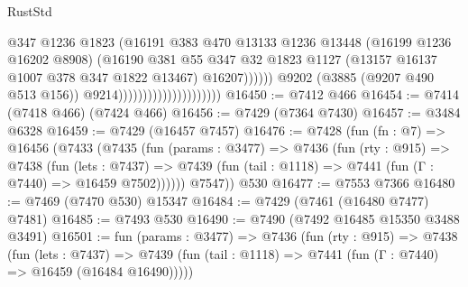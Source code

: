\begin{lexlean}{RustStd}
\begin{coremodule}
                                                      @347
                                                      @1236
                                                      @1823
                                                      (@16191
                                                        @383
                                                        @470
                                                        @13133
                                                        @1236
                                                        @13448
                                                        (@16199 @1236 @16202 @8908)
                                                        (@16190
                                                          @381
                                                          @55
                                                          @347
                                                          @32
                                                          @1823
                                                          @1127
                                                          (@13157
                                                            @16137
                                                            @1007
                                                            @378
                                                            @347
                                                            @1822
                                                            @13467)
                                                          @16207))))))
                                              @9202
                                              (@3885 (@9207 @490 @513 @156))
                                              @9214)))))))))))))))))))))
@16450 := @7412 @466
@16454 := @7414 (@7418 @466) (@7424 @466)
@16456 := @7429 (@7364 @7430)
@16457 := @3484 @6328
@16459 := @7429 (@16457 @7457)
@16476 := @7428
    (fun (fn : @7) =>
    @16456
      (@7433
        (@7435
          (fun (params : @3477) =>
          @7436
            (fun (rty : @915) =>
            @7438
              (fun (lets : @7437) =>
              @7439 (fun (tail : @1118) => @7441 (fun (Γ : @7440) => @16459 @7502))))))
        @7547))
    @530
@16477 := @7553 @7366
@16480 := @7469 (@7470 @530) @15347
@16484 := @7429 (@7461 (@16480 @7477) @7481)
@16485 := @7493 @530
@16490 := @7490 (@7492 @16485 @15350 @3488 @3491)
@16501 := fun (params : @3477) =>
  @7436
    (fun (rty : @915) =>
    @7438
      (fun (lets : @7437) =>
      @7439 (fun (tail : @1118) => @7441 (fun (Γ : @7440) => @16459 (@16484 @16490)))))

\end{coremodule}
\end{lexlean}
